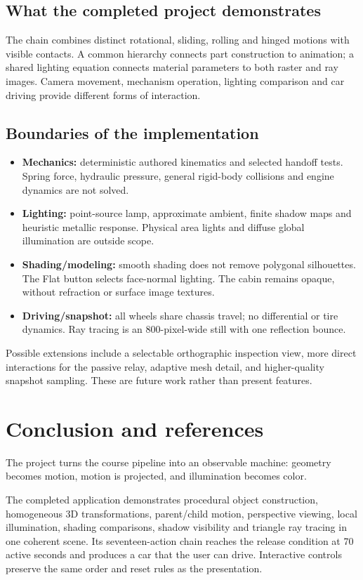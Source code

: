 \documentclass[a4paper,10pt]{article}
\newcommand{\lead}[1]{{\sffamily\color{muted}\normalsize #1\par}\vspace{3pt}}
\newcommand{\reportpage}[2]{\newpage\section{#1}\label{section:\thesection}\lead{#2}}
\numberwithin{equation}{section}
\begin{document}
\subsection*{What the completed project demonstrates}
The chain combines distinct rotational, sliding, rolling and hinged motions with visible contacts. A common hierarchy connects part construction to animation; a shared lighting equation connects material parameters to both raster and ray images. Camera movement, mechanism operation, lighting comparison and car driving provide different forms of interaction.
\subsection*{Boundaries of the implementation}
\begin{itemize}
\item \textbf{Mechanics:} deterministic authored kinematics and selected handoff tests. Spring force, hydraulic pressure, general rigid-body collisions and engine dynamics are not solved.
\item \textbf{Lighting:} point-source lamp, approximate ambient, finite shadow maps and heuristic metallic response. Physical area lights and diffuse global illumination are outside scope.
\item \textbf{Shading/modeling:} smooth shading does not remove polygonal silhouettes. The Flat button selects face-normal lighting. The cabin remains opaque, without refraction or surface image textures.
\item \textbf{Driving/snapshot:} all wheels share chassis travel; no differential or tire dynamics. Ray tracing is an $800$-pixel-wide still with one reflection bounce.
\end{itemize}
Possible extensions include a selectable orthographic inspection view, more direct interactions for the passive relay, adaptive mesh detail, and higher-quality snapshot sampling. These are future work rather than present features.

\reportpage{Conclusion and references}{The project turns the course pipeline into an observable machine: geometry becomes motion, motion is projected, and illumination becomes color.}
The completed application demonstrates procedural object construction, homogeneous 3D transformations, parent/child motion, perspective viewing, local illumination, shading comparisons, shadow visibility and triangle ray tracing in one coherent scene. Its seventeen-action chain reaches the release condition at 70 active seconds and produces a car that the user can drive. Interactive controls preserve the same order and reset rules as the presentation.
\end{document}
